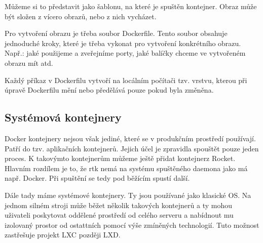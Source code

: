Můžeme si to představit jako šablonu, na které je spuštěn kontejner. Obraz může být složen z vícero obrazů, nebo z nich vycházet. 

Pro vytvoření obrazu je třeba soubor Dockerfile. Tento soubor obsahuje jednoduché kroky, které je třeba vykonat pro vytvoření konkrétního obrazu. Např.: jaké použijeme a zveřejníme porty, jaké balíčky chceme ve vytvořeném obrazu mít atd. 

Každý příkaz v Dockerfilu vytvoří na locálním počítači tzv. vrstvu, kterou při úpravě Dockerfilu mění nebo předělává pouze pokud byla změněna. 


\subsection{Systémová kontejnery}

Docker kontejnery nejsou však jediné, které se v produkčním prostředí používají. Patří do tzv. aplikačních kontejnerů. Jejich účel je zpravidla spouštět pouze jeden proces. K takovýmto kontejnerům můžeme ještě přidat kontejnerz Rocket. Hlavním rozdílem je to, že rtk nemá na systému spuštěného daemona jako má např. Docker. Při spuštění se tedy pod běžícím spustí další. 

Dále tady máme systémové kontejnery. Ty jsou používané jako klasické OS. Na jednom silném stroji může běžet několik takových kontejnerů a ty mohou uživateli poskytovat oddělené prostředí od celého serveru a nabídnout mu izolovaný prostor od ostattních pomocí výše zmíněných technologií. Tuto možnost zastřešuje projekt LXC později LXD.

